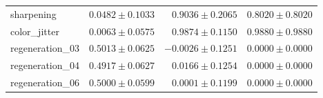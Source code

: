 \begin{table}[t]
\begin{tabular}{lrrr}
    sharpening & $0.0482 \pm 0.1033$ & $0.9036 \pm 0.2065$ & $0.8020 \pm 0.8020$ \\
    color\_jitter & \textbf{$0.0063 \pm 0.0575$} & \textbf{$0.9874 \pm 0.1150$} & \textbf{$0.9880 \pm 0.9880$} \\
    regeneration\_03 & $0.5013 \pm 0.0625$ & $-0.0026 \pm 0.1251$ & $0.0000 \pm 0.0000$ \\
    regeneration\_04 & $0.4917 \pm 0.0627$ & $0.0166 \pm 0.1254$ & $0.0000 \pm 0.0000$ \\
    regeneration\_06 & $0.5000 \pm 0.0599$ & $0.0001 \pm 0.1199$ & $0.0000 \pm 0.0000$ \\
    \bottomrule
  \end{tabular}
\end{table}